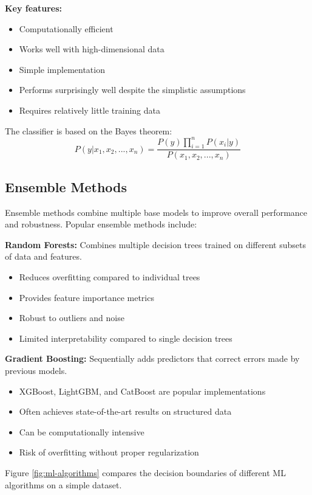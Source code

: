 \documentclass[11pt,a4paper]{report}
\begin{document}
\textbf{Key features:}
\begin{itemize}
    \item Computationally efficient
    \item Works well with high-dimensional data
    \item Simple implementation
    \item Performs surprisingly well despite the simplistic assumptions
    \item Requires relatively little training data
\end{itemize}

The classifier is based on the Bayes theorem:
\begin{equation}
P(y|x_1, x_2, ..., x_n) = \frac{P(y) \prod_{i=1}^{n} P(x_i|y)}{P(x_1, x_2, ..., x_n)}
\end{equation}

\subsection{Ensemble Methods}
Ensemble methods combine multiple base models to improve overall performance and robustness. Popular ensemble methods include:

\textbf{Random Forests:} Combines multiple decision trees trained on different subsets of data and features.
\begin{itemize}
    \item Reduces overfitting compared to individual trees
    \item Provides feature importance metrics
    \item Robust to outliers and noise
    \item Limited interpretability compared to single decision trees
\end{itemize}

\textbf{Gradient Boosting:} Sequentially adds predictors that correct errors made by previous models.
\begin{itemize}
    \item XGBoost, LightGBM, and CatBoost are popular implementations
    \item Often achieves state-of-the-art results on structured data
    \item Can be computationally intensive
    \item Risk of overfitting without proper regularization
\end{itemize}

Figure \ref{fig:ml-algorithms} compares the decision boundaries of different ML algorithms on a simple dataset.
\end{document}
